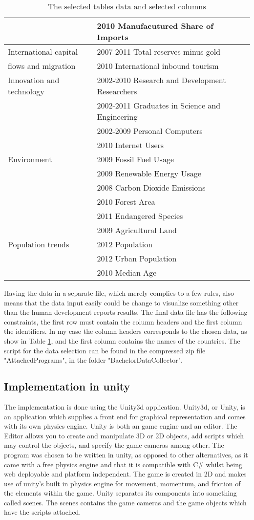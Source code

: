 \documentclass[a4paper,11pt]{article}
\begin{document}
\begin{table}
\begin{tabular}{|l|l|}
		& 2010 Manufacutured Share of Imports \\
		\hline
		International capital & 2007-2011 Total reserves minus gold\\
		flows and migration & 2010 International inbound tourism\\
		\hline
		Innovation and technology & 2002-2010 Research and Development Researchers\\
		& 2002-2011 Graduates in Science and Engineering\\
		& 2002-2009 Personal Computers\\
		& 2010 Internet Users\\
		\hline
		Environment & 2009 Fossil Fuel Usage\\
		& 2009 Renewable Energy Usage\\ 
		& 2008 Carbon Dioxide Emissions\\
		& 2010 Forest Area\\ 
		& 2011 Endangered Species\\
		& 2009 Agricultural Land\\
		\hline
		Population trends & 2012 Population\\
		& 2012 Urban Population\\
		& 2010 Median Age\\
		\hline
	\end{tabular}
	\caption{The selected tables data and selected columns}
	\label{Tab:dataSelect}
\end{table}

Having the data in a separate file, which merely complies to a few rules, also means that the data input easily could be change to visualize something other than the human development reports results. The final data file has the following constraints, the first row must contain the column headers and the first column the identifiers. In my case the column headers corresponds to the chosen data, as show in Table \ref{Tab:dataSelect}, and the first column contains the names of the countries.
The script for the data selection can be found in the compressed zip file "AttachedPrograms", in the folder "BachelorDataCollector".
\subsection{Implementation in unity}
\label{meth:unity}
The implementation is done using the Unity3d application\cite{unity3d}. Unity3d, or Unity, is an application which supplies a front end for graphical representation and comes with its own physics engine. Unity is both an game engine and an editor. The Editor allows you to create and manipulate 3D or 2D objects, add scripts which may control the objects, and specify the game cameras among other. The program was chosen to be written in unity, as opposed to other alternatives, as it came with a free physics engine and that it is compatible with C\# whilst being web deployable and platform independent. The game is created in 2D and makes use of unity's built in physics engine for movement, momentum, and friction of the elements within the game. Unity separates its components into something called scenes. The scenes contains the game cameras and the game objects which have the scripts attached.
\end{document}

